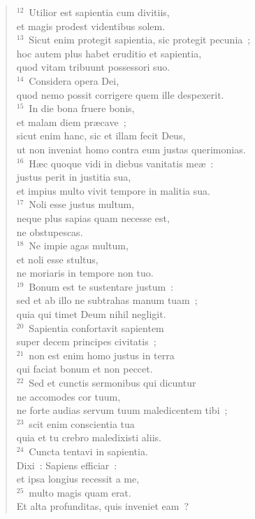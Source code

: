\begin{flushleft}
\begin{verse}
${}^{12}$~Utilior est sapientia cum divitiis,\\ et magis prodest videntibus solem.\\
${}^{13}$~Sicut enim protegit sapientia, sic protegit pecunia~;\\ hoc autem plus habet eruditio et sapientia,\\ quod vitam tribuunt possessori suo.\\
${}^{14}$~Considera opera Dei,\\ quod nemo possit corrigere quem ille despexerit.\\
${}^{15}$~In die bona fruere bonis,\\ et malam diem pr\ae cave~;\\ sicut enim hanc, sic et illam fecit Deus,\\ ut non inveniat homo contra eum justas querimonias.\\
${}^{16}$~H\ae c quoque vidi in diebus vanitatis me\ae~:\\ justus perit in justitia sua,\\ et impius multo vivit tempore in malitia sua.\\
${}^{17}$~Noli esse justus multum,\\ neque plus sapias quam necesse est,\\ ne obstupescas.\\
${}^{18}$~Ne impie agas multum,\\ et noli esse stultus,\\ ne moriaris in tempore non tuo.\\
${}^{19}$~Bonum est te sustentare justum~:\\ sed et ab illo ne subtrahas manum tuam~;\\ quia qui timet Deum nihil negligit.\\
${}^{20}$~Sapientia confortavit sapientem\\ super decem principes civitatis~;\\
${}^{21}$~non est enim homo justus in terra\\ qui faciat bonum et non peccet.\\
${}^{22}$~Sed et cunctis sermonibus qui dicuntur\\ ne accomodes cor tuum,\\ ne forte audias servum tuum maledicentem tibi~;\\
${}^{23}$~scit enim conscientia tua\\ quia et tu crebro maledixisti aliis.\\
${}^{24}$~Cuncta tentavi in sapientia.\\ Dixi~: Sapiens efficiar~:\\ et ipsa longius recessit a me,\\
${}^{25}$~multo magis quam erat.\\ Et alta profunditas, quis inveniet eam~?\end{verse}\end{flushleft}


